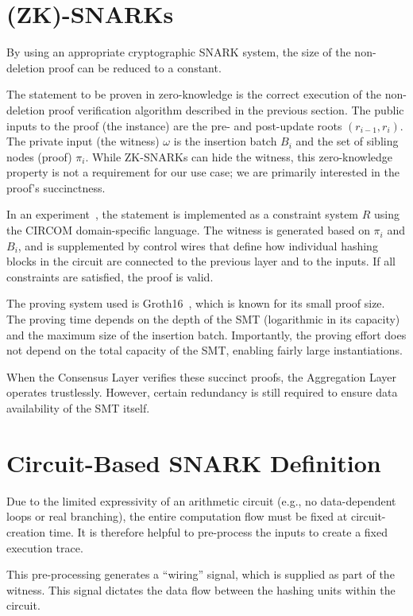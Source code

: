 \documentclass[twocolumn]{article}
\begin{document}
\section{(ZK)-SNARKs}

By using an appropriate cryptographic SNARK system, the size of the non-deletion proof can be reduced to a constant.

The statement to be proven in zero-knowledge is the correct execution of the non-deletion proof verification algorithm described in the previous section. The public inputs to the proof (the instance) are the pre- and post-update roots $(r_{i-1}, r_i)$. The private input (the witness) $\omega$ is the insertion batch $B_i$ and the set of sibling nodes (proof) $\pi_i$. While ZK-SNARKs can hide the witness, this zero-knowledge property is not a requirement for our use case; we are primarily interested in the proof's succinctness.

In an experiment~\cite{snark}, the statement is implemented as a constraint system $R$ using the CIRCOM domain-specific language. The witness is generated based on $\pi_i$ and $B_i$, and is supplemented by control wires that define how individual hashing blocks in the circuit are connected to the previous layer and to the inputs. If all constraints are satisfied, the proof is valid.

The proving system used is Groth16~\cite{cryptoeprint:2016/260}, which is known for its small proof size. The proving time depends on the depth of the SMT (logarithmic in its capacity) and the maximum size of the insertion batch. Importantly, the proving effort does not depend on the total capacity of the SMT, enabling fairly large instantiations.

When the Consensus Layer verifies these succinct proofs, the Aggregation Layer operates trustlessly. However, certain redundancy is still required to ensure data availability of the SMT itself.


\section{Circuit-Based SNARK Definition}

Due to the limited expressivity of an arithmetic circuit (e.g., no data-dependent loops or real branching), the entire computation flow must be fixed at circuit-creation time. It is therefore helpful to pre-process the inputs to create a fixed execution trace.

This pre-processing generates a ``wiring'' signal, which is supplied as part of the witness. This signal dictates the data flow between the hashing units within the circuit.
\end{document}
